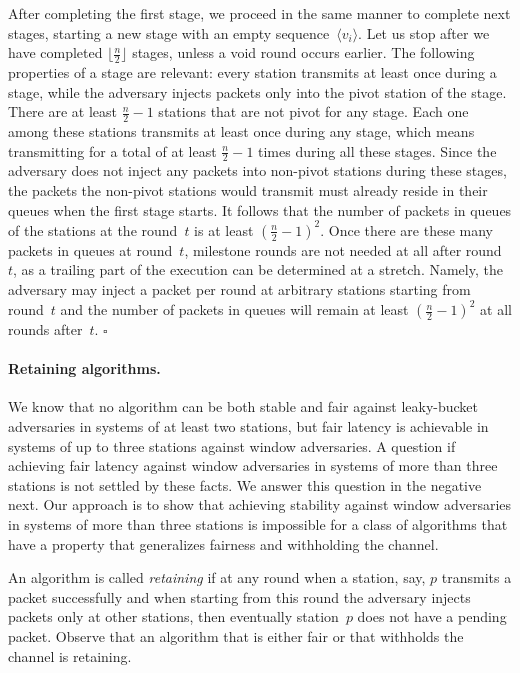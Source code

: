 \documentclass[11pt]{article}
\newcommand{\BBB}{\vspace*{-\bigskipamount}}
\newcommand{\Paragraph}[1]{\BBB\paragraph{#1}}
\newcommand{\qed}{\hfill $\square$ \smallbreak}
\newenvironment{proof}{\noindent{\bf Proof:}}{\qed}
\begin{document}
\begin{proof}
After completing the first stage, we proceed in the same manner to complete next stages, starting a new stage with an empty sequence~$\langle v_i\rangle$.
Let us stop after we have completed $\lfloor \frac{n}{2}\rfloor$ stages, unless a void round occurs earlier.
The following properties of a stage are relevant: every station transmits at least once during a stage, while the adversary injects packets only into the pivot station of the stage.
There are at least $\frac{n}{2}-1$ stations that are not pivot for any stage.
Each one among these stations transmits at least once during any stage, which means transmitting for a total of at least $\frac{n}{2}-1$ times during all these stages.
Since the adversary does not inject any packets into non-pivot stations during these stages, the packets the non-pivot stations would transmit must already reside in their queues when the first stage starts.
It follows that the number of packets in queues of the stations  at the round~$t$ is at least $\left(\frac{n}{2}-1\right)^2$.
Once there are these many packets in queues at round~$t$, milestone rounds are not needed at all after round~$t$, as a trailing part of the execution can be determined at a stretch.
Namely, the adversary may inject a packet per round at arbitrary stations starting from round~$t$ and the number of packets in queues will remain at least $\left(\frac{n}{2}-1\right)^2$ at all rounds after~$t$.
\end{proof}





\Paragraph{Retaining algorithms.}




We know that no algorithm can be both stable and fair against leaky-bucket adversaries in systems of at least two stations, but fair latency is achievable in systems of up to three stations against window adversaries.
A question if achieving fair latency against window adversaries in systems of more than three stations is not settled by these facts.
We answer this question in the negative next.
Our approach is to show that achieving stability  against window adversaries in systems of more than three stations is impossible for a class of algorithms that have a property that  generalizes fairness and withholding the channel.

An algorithm is called \emph{retaining} if at any round when a station, say, $p$ transmits a packet successfully and when starting from this round the adversary injects packets only at other stations, then eventually station~$p$ does not have a pending packet.
Observe that an algorithm that is either fair or that withholds the channel is retaining.
\end{document}
